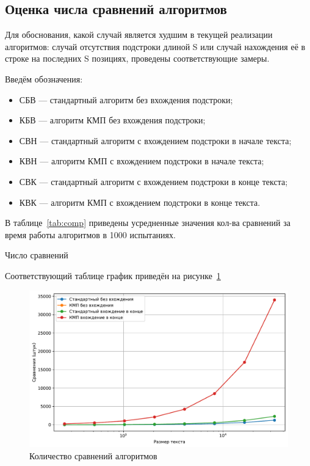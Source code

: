 \newpage

\subsection{Оценка числа сравнений алгоритмов}
Для обоснования, какой случай является худшим в текущей реализации алгоритмов: случай отсутствия подстроки длиной S или случай нахождения её в строке на последних S позициях, проведены соответствующие замеры.

Введём обозначения:
\begin{itemize}[]
	\item СБВ --- стандартный алгоритм без вхождения подстроки;
	\item КБВ --- алгоритм КМП без вхождения подстроки;
	\item СВН --- стандартный алгоритм с вхождением подстроки в начале текста;
	\item КВН --- алгоритм КМП с вхождением подстроки в начале текста;
	\item СВК --- стандартный алгоритм с вхождением подстроки в конце текста;
	\item КВК --- алгоритм КМП с вхождением подстроки в конце текста.
\end{itemize}

В таблице~\ref{tab:comp} приведены усредненные значения кол-ва сравнений за время работы алгоритмов в 1000 испытаниях.

\begin{table}[hbtp]
	\centering
	\caption{Число сравнений}
	\label{tab:comp}
\end{table}

Соответствующий таблице график приведён на рисунке~\ref{fig:comp}
\begin{figure}
	\centering
	\includegraphics[width=1\linewidth]{../src/lab_07/results_comparison_logscale}
	\caption{Количество сравнений алгоритмов}
	\label{fig:comp}
\end{figure}

